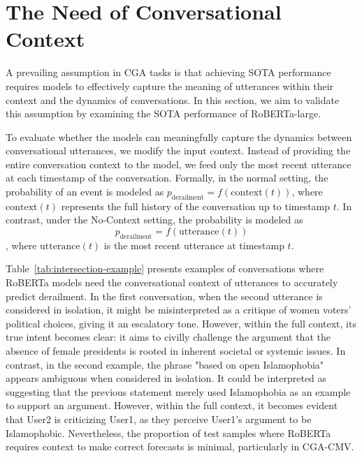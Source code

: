 \section{The Need of Conversational Context}

A prevailing assumption in CGA tasks is that achieving SOTA performance requires models to effectively capture the meaning of utterances within their context and the dynamics of conversations. In this section, we aim to validate this assumption by examining the SOTA performance of RoBERTa-large.


To evaluate whether the models can meaningfully capture the dynamics between conversational utterances, we modify the input context. 
%
Instead of providing the entire conversation context to the model, we feed only the most recent utterance at each timestamp of the conversation. 
%
Formally, in the normal setting, the probability of an event is modeled as $p_{\text{derailment}} = f(\text{context}(t))$, where $\text{context}(t)$ represents the full history of the conversation up to timestamp $t$. 
%
In contrast, under the No-Context setting, the probability is modeled as $$p_{\text{derailment}} = f(\text{utterance}(t))$$, where $\text{utterance}(t)$ is the most recent utterance at timestamp $t$. 



Table~\ref{tab:intersection-example} presents examples of conversations where RoBERTa models need the conversational context of utterances to accurately predict derailment. 
%
In the first conversation, when the second utterance is considered in isolation, it might be misinterpreted as a critique of women voters' political choices, giving it an escalatory tone. 
%
However, within the full context, its true intent becomes clear: it aims to civilly challenge the argument that the absence of female presidents is rooted in inherent societal or systemic issues.
%
In contrast, in the second example, the phrase "based on open Islamophobia" appears ambiguous when considered in isolation. 
%
It could be interpreted as suggesting that the previous statement merely used Islamophobia as an example to support an argument.
%
However, within the full context, it becomes evident that User2 is criticizing User1, as they perceive User1's argument to be Islamophobic. 
%
Nevertheless, the proportion of test samples where RoBERTa requires context to make correct forecasts is minimal, particularly in CGA-CMV.

